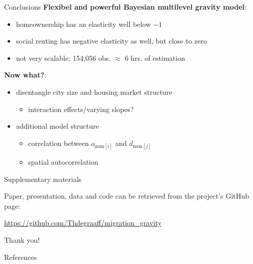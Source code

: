 \documentclass{beamer}
\begin{document}
\begin{frame}{Conclusions}
\textbf{Flexibel and powerful Bayesian multilevel gravity model}:
\begin{itemize}
	\item homeownership has an \alert{elasticity} well below $-1$
	\item social renting has negative elasticity as well, but close to \alert{zero} \citep{boyle1998migration}
	\item not very \alert{scalable}; 154,056 obs. $\approx$ 6 hrs. of estimation
\end{itemize}

\textbf{Now what?}:
\begin{itemize}
	\item \alert{disentangle} city size and housing market structure
	\begin{itemize}
		\item interaction effects/varying slopes?
	\end{itemize}
	\item additional model structure
	\begin{itemize}
		\item correlation between $o_{\text{mun}[i]}$ and $d_{\text{mun}[j]}$
		\item \alert{spatial} autocorrelation
	\end{itemize}
\end{itemize}
\end{frame}

\begin{frame}{Supplementary materials}

Paper, presentation, data and code can be retrieved from the project's GitHub page: 

\begin{center}\url{https://github.com/Thdegraaff/migration\_gravity}\end{center}

\end{frame}

\begin{frame}[standout]
Thank you!
\end{frame}

\appendix

\begin{frame}[allowframebreaks]{References}

		\printbibliography[heading=none]

\end{frame}
\end{document}
